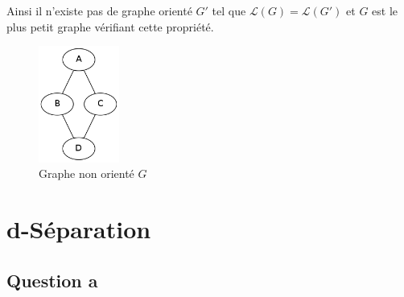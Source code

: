 \documentclass{article}
\begin{document}
Ainsi il n'existe pas de graphe orienté $G'$ tel que $\mathcal{L}(G) = \mathcal{L}(G')$ et $G$ est le plus petit graphe vérifiant cette propriété.


\begin{figure}[h]
\caption{Graphe non orienté $G$}
\includegraphics[width=100px]{Ia.png}
\end{figure}

\section{d-Séparation}

\subsection{Question a}
\end{document}
